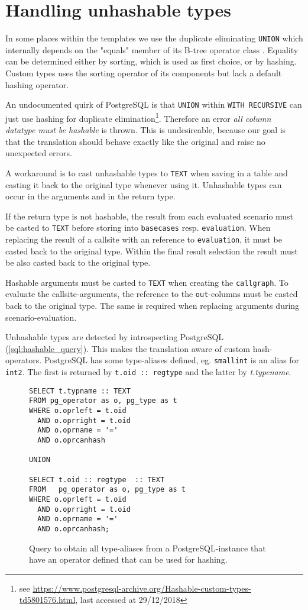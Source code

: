 \section{Handling unhashable types}

In some places within the templates we use the duplicate eliminating \texttt{UNION} which internally depends on the "equals" member of its B-tree operator class \cite[p. 1042 f.]{psql}. Equality can be determined either by sorting, which is used as first choice, or by hashing. Custom types uses the sorting operator of its components but lack a default hashing operator.

An undocumented quirk of PostgreSQL is that \texttt{UNION} within \texttt{WITH RECURSIVE} can just use hashing for duplicate elimination\footnote{see \url{https://www.postgresql-archive.org/Hashable-custom-types-td5801576.html}, last accessed at 29/12/2018}. Therefore an error \textit{all column datatype must be hashable} is thrown. This is undesireable, because our goal is that the translation should behave exactly like the original and raise no unexpected errors.

A workaround is to cast unhashable types to \texttt{TEXT} when saving in a table and casting it back to the original type whenever using it. Unhashable types can occur in the arguments and in the return type.

If the return type is not hashable, the result from each evaluated scenario must be casted to \texttt{TEXT} before storing into \texttt{basecases} resp. \texttt{evaluation}. When replacing the result of a callsite with an reference to \texttt{evaluation}, it must be casted back to the original type. Within the final result selection the result must be also casted back to the original type.

Hashable arguments must be casted to \texttt{TEXT} when creating the \texttt{callgraph}. To evaluate the callsite-arguments, the reference to the \texttt{out}-columns must be casted back to the original type. The same is required when replacing arguments during scenario-evaluation.

Unhashable types are detected by introspecting PostgreSQL (\autoref{sql:hashable_query}). This makes the translation aware of custom hash-operators. PostgreSQL has some type-aliases defined, eg. \texttt{smallint} is an alias for \texttt{int2}. The first is returned by \texttt{t.oid :: regtype} and the latter by \textit{t.typename}.

\begin{figure}
    \centering
\begin{verbatim}
SELECT t.typname :: TEXT 
FROM pg_operator as o, pg_type as t 
WHERE o.oprleft = t.oid 
  AND o.oprright = t.oid 
  AND o.oprname = '=' 
  AND o.oprcanhash 

UNION

SELECT t.oid :: regtype  :: TEXT 
FROM   pg_operator as o, pg_type as t 
WHERE o.oprleft = t.oid 
  AND o.oprright = t.oid 
  AND o.oprname = '=' 
  AND o.oprcanhash;
\end{verbatim}
    \caption{Query to obtain all type-aliases from a PostgreSQL-instance that have an operator defined that can be used for hashing.}
    \label{sql:hashable_query}
\end{figure}